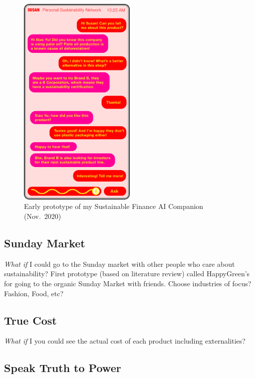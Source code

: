\documentclass[
  letterpaper,
  DIV=11,
  numbers=noendperiod]{scrartcl}
\begin{document}
\begin{figure}[H]

{\centering \includegraphics[width=0.5\textwidth,height=\textheight]{./images/susan-pink-app.png}

}

\caption{Early prototype of my Sustainable Finance AI Companion
(Nov.~2020)}

\end{figure}%

\subsection{Sunday Market}\label{sunday-market}

\emph{What if} I could go to the Sunday market with other people who
care about sustainability? First prototype (based on literature review)
called HappyGreen's for going to the organic Sunday Market with friends.
Choose industries of focus? Fashion, Food, etc?

\subsection{True Cost}\label{true-cost}

\emph{What if} I you could see the actual cost of each product including
externalities?

\subsection{Speak Truth to Power}\label{speak-truth-to-power}
\end{document}
